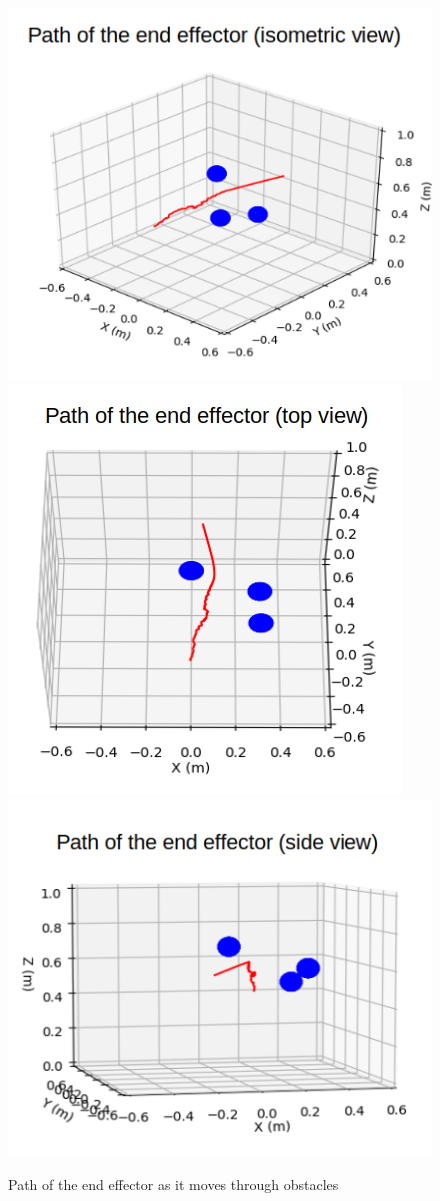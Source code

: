 \documentclass[a4paper, 11.5pt, conference]{ieeeconf}      %
\begin{document}
\begin{figure}[H]
	\centering
	\includegraphics[scale=0.30]{images/one_arm_three_obstacles.png}
	\includegraphics[scale=0.30]{images/one_arm_three_obstacles_top.png}
	\includegraphics[scale=0.30]{images/one_arm_three_obstacles_side.png}
	\caption{Path of the end effector as it moves through obstacles}
	\label{fig:one_arm_avoidance}
\end{figure}
\end{document}
